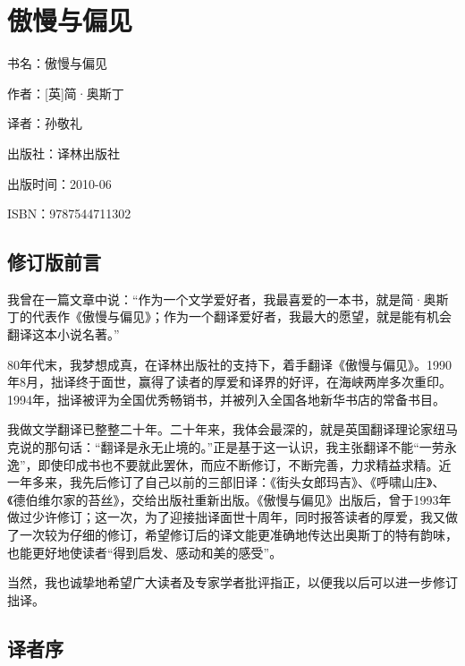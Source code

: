 



\section{傲慢与偏见}



\par 书名：傲慢与偏见
\par 作者：[英]简·奥斯丁
\par 译者：孙敬礼
\par 出版社：译林出版社
\par 出版时间：2010-06
\par ISBN：9787544711302

\subsection*{修订版前言}
\par 我曾在一篇文章中说：“作为一个文学爱好者，我最喜爱的一本书，就是简·奥斯丁的代表作《傲慢与偏见》；作为一个翻译爱好者，我最大的愿望，就是能有机会翻译这本小说名著。”
\par 80年代末，我梦想成真，在译林出版社的支持下，着手翻译《傲慢与偏见》。1990年8月，拙译终于面世，赢得了读者的厚爱和译界的好评，在海峡两岸多次重印。1994年，拙译被评为全国优秀畅销书，并被列入全国各地新华书店的常备书目。
\par 我做文学翻译已整整二十年。二十年来，我体会最深的，就是英国翻译理论家纽马克说的那句话：“翻译是永无止境的。”正是基于这一认识，我主张翻译不能“一劳永逸”，即使印成书也不要就此罢休，而应不断修订，不断完善，力求精益求精。近一年多来，我先后修订了自己以前的三部旧译：《街头女郎玛吉》、《呼啸山庄》、《德伯维尔家的苔丝》，交给出版社重新出版。《傲慢与偏见》出版后，曾于1993年做过少许修订；这一次，为了迎接拙译面世十周年，同时报答读者的厚爱，我又做了一次较为仔细的修订，希望修订后的译文能更准确地传达出奥斯丁的特有韵味，也能更好地使读者“得到启发、感动和美的感受”。
\par 当然，我也诚挚地希望广大读者及专家学者批评指正，以便我以后可以进一步修订拙译。
\par {}
\par {}


\subsection*{译者序}

